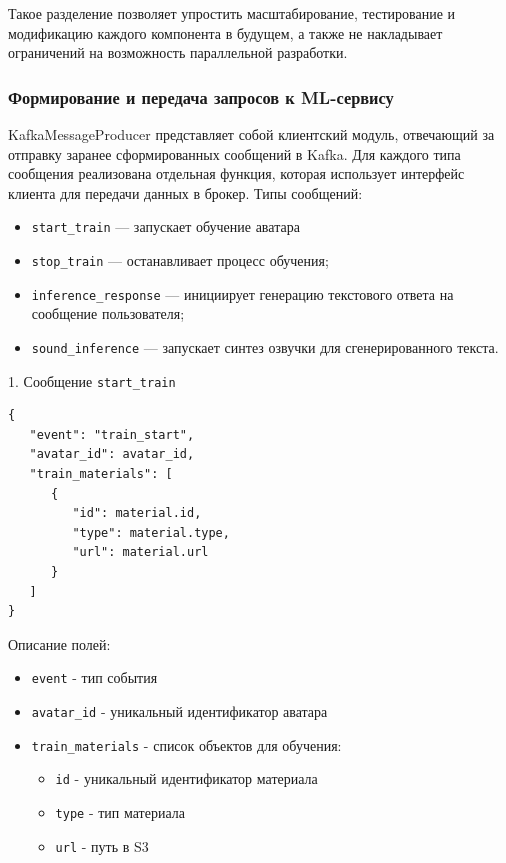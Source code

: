 Такое разделение позволяет упростить масштабирование, тестирование и модификацию каждого компонента в будущем, а также не накладывает ограничений на возможность параллельной разработки.


\subsubsection{Формирование и передача запросов к ML-сервису}
KafkaMessageProducer представляет собой клиентский модуль, отвечающий за отправку заранее сформированных сообщений в Kafka. Для каждого типа сообщения реализована отдельная функция, которая использует интерфейс клиента для передачи данных в брокер.\newline
Типы сообщений:
\begin{itemize}
    \item \texttt{start\_train} — запускает обучение аватара
    \item \texttt{stop\_train} — останавливает процесс обучения;
    \item \texttt{inference\_response} — инициирует генерацию текстового ответа на сообщение пользователя;
    \item \texttt{sound\_inference} — запускает синтез озвучки для сгенерированного текста.
\end{itemize}

1. Сообщение \texttt{start\_train}
\begin{lstlisting}[style=jsonstyle, numbers=none, frame=none]
{
   "event": "train_start",
   "avatar_id": avatar_id,
   "train_materials": [
      {
         "id": material.id,
         "type": material.type,
         "url": material.url
      }
   ]
}
\end{lstlisting}
Описание полей:
\begin{itemize}
    \item \texttt{event} - тип события
    \item \texttt{avatar\_id} - уникальный идентификатор аватара
    \item \texttt{train\_materials} - список объектов для обучения:
    \begin{itemize}
        \item \texttt{id} - уникальный идентификатор материала
        \item \texttt{type} - тип материала
        \item \texttt{url} - путь в S3
    \end{itemize}
\end{itemize}

